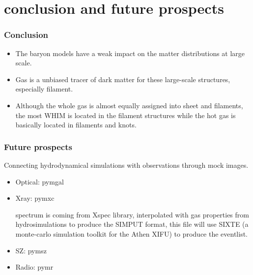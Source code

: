 \documentclass[aspectratio=43]{beamer}
\begin{document}
\section{conclusion and future prospects}
\begin{frame}
  \frametitle{Conclusion}
  {\Large
  \begin{itemize}
    \item The baryon models have a weak impact on the matter distributions at large scale.
    \item Gas is a unbiased tracer of dark matter for these large-scale structures, especially filament.
    \item Although the whole gas is almost equally assigned into sheet and filaments, the most WHIM is located in the filament structures while the hot gas is basically located in filaments and knots.
  \end{itemize}}
\end{frame}

\begin{frame}
  \frametitle{Future prospects}
  Connecting hydrodynamical simulations with observations through mock images.
  \begin{itemize}
    \item Optical: pymgal
    \item Xray: pymxc 
    
        spectrum is coming from Xspec library, interpolated with gas properties from hydrosimulations to produce the SIMPUT format, this file will use SIXTE (a monte-carlo simulation toolkit for the Athen XIFU) to produce the eventlist.
    \item SZ: pymsz
    \item Radio: pymr
  \end{itemize}

\end{frame}

\end{document}
